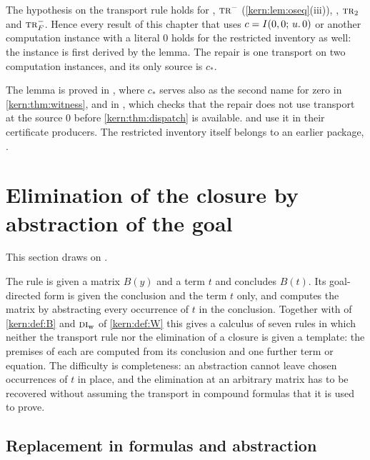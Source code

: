 The hypothesis on the transport rule holds for ,
$\rulename{Tr}^{-}$ (\cref{kern:lem:oseq}(iii)), ,
$\rulename{Tr}_{2}$ and $\rulename{Tr}_{F}^{-}$.  Hence every result of this
chapter that uses $c=I(0,0;\,u.\,0)$ or another computation instance with a
literal $0$ holds for the restricted inventory as well: the instance is
first derived by the lemma.  The repair is one transport on two computation
instances, and its only source is $c_{*}$.

\begin{remark}[Sources]
\label{kern:rem:comprepair-sources}
The lemma is proved in , where $c_{*}$ serves also as the
second name for zero in \cref{kern:thm:witness}, and in
, which checks that the repair does not use transport
at the source $0$ before \cref{kern:thm:dispatch} is available.
 and  use it in their certificate
producers.  The restricted inventory itself belongs to an earlier package,
.
\end{remark}

\section{Elimination of the closure by abstraction of the goal}
\label{kern:sec:aqe}

This section draws on .

The rule  is given a matrix $B(y)$ and a term $t$ and concludes
$B(t)$.  Its goal-directed form is given the conclusion and the term $t$
only, and computes the matrix by abstracting every occurrence of $t$ in the
conclusion.  Together with  of \cref{kern:def:B} and
$\rulename{DI}_{\mathrm{w}}$ of \cref{kern:def:W} this gives a calculus of
seven rules in which neither the transport rule nor the elimination of a
closure is given a template: the premises of each are computed from its
conclusion and one further term or equation.  The difficulty is completeness: an
abstraction cannot leave chosen occurrences of $t$ in place, and the
elimination at an arbitrary matrix has to be recovered without assuming the
transport in compound formulas that it is used to prove.

\subsection{Replacement in formulas and abstraction}
\label{kern:sec:abstr}

